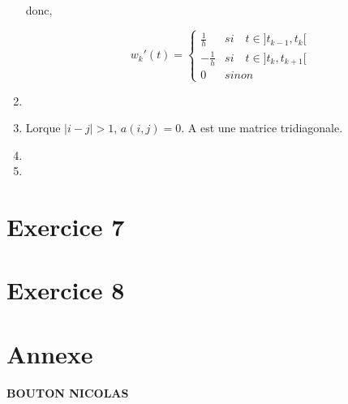 \documentclass[12pt, letterpaper]{article}
\begin{document}
\begin{enumerate}
  donc,

  \begin{equation*}
    w_k'(t) = 
    \left\{
    \begin{array}{ll}
      \frac{1}{h} & si \quad t \in ]t_{k-1},
        t_k[ \\
      - \frac{1}{h} & si \quad t \in ]t_k,
        t_{k+1}[ \\
      0 & sinon
    \end{array}
    \right.
  \end{equation*}


\item

\item
  Lorque $|i - j| > 1$, $a(i, j) = 0$. A est une matrice tridiagonale.

\item

\item
  

\end{enumerate}

\section*{Exercice 7}

\section*{Exercice 8}

\newpage

\section*{Annexe}

\textbf{BOUTON NICOLAS}



\newpage



\newpage



\newpage



\newpage



\newpage



\newpage


\end{document}
